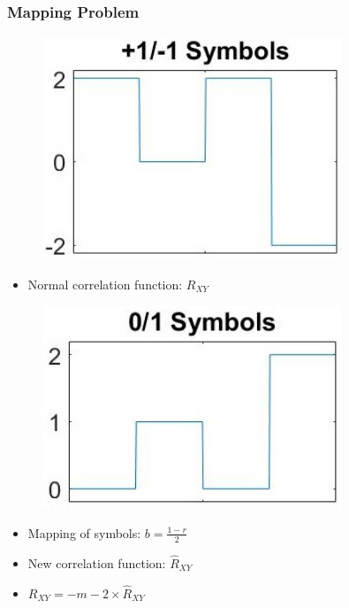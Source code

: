 \documentclass{beamer}
\begin{document}
	\begin{frame}\frametitle{Mapping Problem}



		\noindent
		\begin{minipage}{.5\linewidth}
			\begin{figure}
				\centering
				\includegraphics[width=0.8\textwidth]{mapping_radio_symbols.jpg}
			\end{figure}

			\begin{itemize}
				\item Normal correlation function: $R_{XY}$
			\end{itemize}
			
		\end{minipage}%
		\begin{minipage}{.5\linewidth}
			\begin{figure}
				\centering
				\includegraphics[width=0.8\textwidth]{mapping_binary_symbols.jpg}
			\end{figure}

			\begin{itemize}
				\item Mapping of symbols: $b = \frac{1 - r}{2}$
				\item New correlation function: $\hat{R}_{XY}$
				\item $R_{XY} = -m - 2 \times \hat{R}_{XY}$
			\end{itemize}



\end{minipage}
\end{frame}
\end{document}
